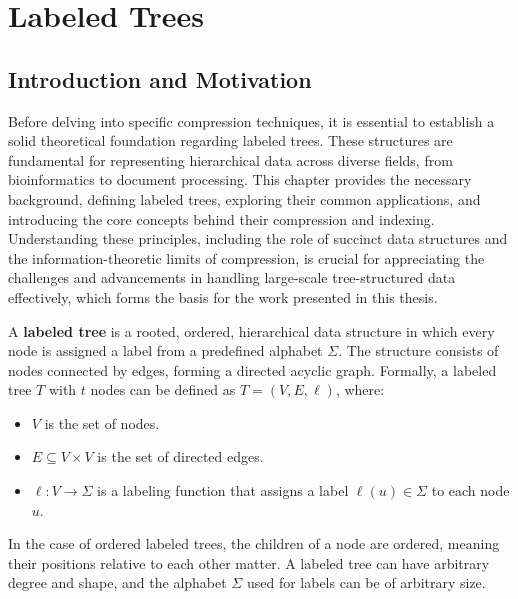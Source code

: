 \chapter{Labeled Trees} \label{chp:thbg_labeled_tree}
\section{Introduction and Motivation}
Before delving into specific compression techniques, it is essential to establish a solid theoretical foundation regarding labeled trees. These structures are fundamental for representing hierarchical data across diverse fields, from bioinformatics to document processing. This chapter provides the necessary background, defining labeled trees, exploring their common applications, and introducing the core concepts behind their compression and indexing. Understanding these principles, including the role of succinct data structures and the information-theoretic limits of compression, is crucial for appreciating the challenges and advancements in handling large-scale tree-structured data effectively, which forms the basis for the work presented in this thesis.

\begin{definition}
    A \textbf{labeled tree} is a rooted, ordered, hierarchical data structure in which every node is assigned a label from a predefined alphabet $\Sigma$. The structure consists of nodes connected by edges, forming a directed acyclic graph. Formally, a labeled tree $T$ with $t$ nodes can be defined as $T = (V, E, \ell)$, where:
    \begin{itemize}
        \item $V$ is the set of nodes.
        \item $E \subseteq V \times V$ is the set of directed edges.
        \item $\ell: V \to \Sigma$ is a labeling function that assigns a label $\ell(u) \in \Sigma$ to each node $u$.
    \end{itemize}
\end{definition}


In the case of ordered labeled trees, the children of a node are ordered, meaning their positions relative to each other matter. A labeled tree can have arbitrary degree and shape, and the alphabet $\Sigma$ used for labels can be of arbitrary size.

